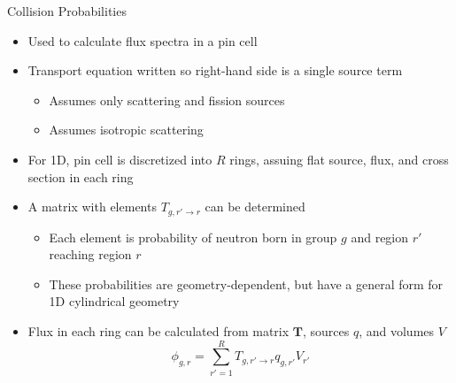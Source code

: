 
\begin{frame}[t]{Collision Probabilities}

\begin{itemize}
    \item Used to calculate flux spectra in a pin cell
    \item Transport equation written so right-hand side is a single source term
    \begin{itemize}
        \item Assumes only scattering and fission sources
        \item Assumes isotropic scattering
    \end{itemize}
    \item For 1D, pin cell is discretized into $R$ rings, assuing flat source, flux, and cross section in each ring
    \item A matrix with elements $T_{g,r' \rightarrow r}$ can be determined
    \begin{itemize}
        \item Each element is probability of neutron born in group $g$ and region $r'$ reaching region $r$
        \item These probabilities are geometry-dependent, but have a general form for 1D cylindrical geometry
    \end{itemize}
    \item Flux in each ring can be calculated from matrix $\bm T$, sources $q$, and volumes $V$
\begin{equation*}\scriptstyle
\phi_{g,r} = \sum_{r'=1}^R T_{g,r'\rightarrow r} q_{g,r'} V_{r'}
\end{equation*}
\end{itemize}

\end{frame}


\begin{frame}
\begin{center}
\resizebox{0.5\textwidth}{!}{}
\end{center}
\end{frame}


\begin{frame}
\begin{center}
\resizebox{0.6\textwidth}{!}{}
\end{center}
\end{frame}

